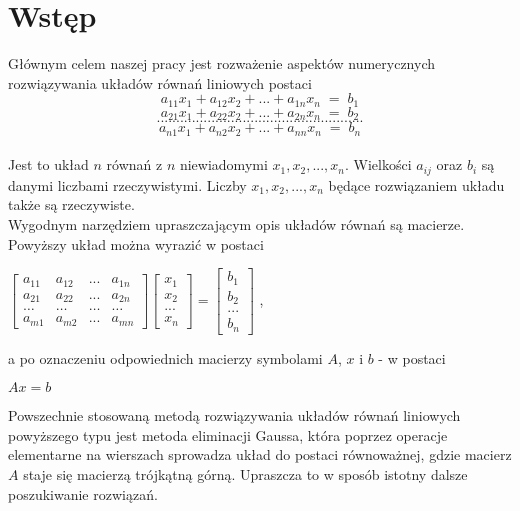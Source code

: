 \documentclass[a4paper]{article}
\begin{document}
\section{Wstęp}
Głównym celem naszej pracy jest rozważenie aspektów numerycznych rozwiązywania układów równań liniowych postaci\\
\[
 a_{11}x_1 + a_{12}x_2 + ... + a_{1n}x_n\;=\;b_1
 \]
\[
 a_{21}x_1 + a_{22}x_2 + ... + a_{2n}x_n\;=\;b_2
\]
\[
 .....................................................
\]
\[
 a_{n1}x_1 + a_{n2}x_2 + ... + a_{nn}x_n\;=\;b_n
\]\\
Jest to układ $n$ równań z $n$ niewiadomymi $x_1, x_2, ... , x_n$. Wielkości $a_{ij}$ oraz $b_i$ są danymi liczbami rzeczywistymi. Liczby $x_1, x_2, ... , x_n$ będące rozwiązaniem układu także są rzeczywiste.\\
Wygodnym narzędziem upraszczającym opis układów równań są macierze. Powyższy układ można wyrazić w postaci
\begin{center}
$\begin{bmatrix}  a_{11} &a_{12}  &...  &a_{1n} \\   a_{21} &a_{22}  &...  &a_{2n} \\    \ldots& \ldots & \ldots &\ldots \\   a_{m1} &a_{m2}  &...  &a_{mn}  \end{bmatrix}
\begin{bmatrix}  x_1 \\ x_2 \\ ... \\ x_n  \end{bmatrix}=
\begin{bmatrix}  b_1 \\ b_2 \\ ... \\ b_n  \end{bmatrix}$
,\\
\end{center}
a po oznaczeniu odpowiednich macierzy symbolami $A$, $x$ i $b$ - w postaci
\begin{center}
$Ax=b$
\end{center}

Powszechnie stosowaną metodą rozwiązywania układów równań liniowych powyższego typu jest metoda eliminacji Gaussa, która poprzez operacje elementarne na wierszach sprowadza układ do postaci równoważnej, gdzie macierz $A$
staje się macierzą trójkątną górną. Upraszcza to w sposób istotny dalsze poszukiwanie rozwiązań.
\end{document}
